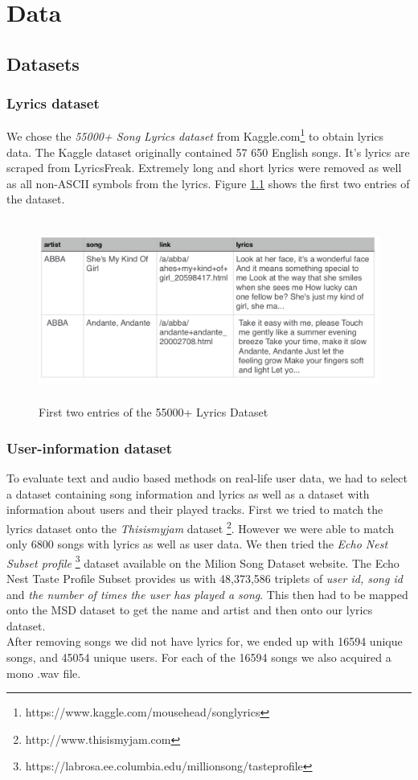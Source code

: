 \chapter{Data}

\section{Datasets}

\subsection{Lyrics dataset}
 We chose the \textit{55000+ Song Lyrics dataset} from Kaggle.com\footnote{https://www.kaggle.com/mousehead/songlyrics} to obtain lyrics data. The Kaggle dataset originally contained 57 650 English songs. It’s lyrics are scraped from LyricsFreak. Extremely long and short lyrics were removed as well as all non-ASCII symbols from the lyrics. Figure \ref{fig:lyrics_dataset} shows the first two entries of the dataset.\\
 \begin{figure}[h]
    \centering
	\includegraphics[height=60mm]{./img/dataset_preview.png}
	\caption{First two entries of the 55000+ Lyrics Dataset}
	\label{fig:lyrics_dataset}
\end{figure}

\subsection{User-information dataset}
To evaluate text and audio based methods on real-life user data, we had to select a dataset containing song information and lyrics as well as a dataset with information about users and their played tracks. First we tried to match the lyrics dataset onto the \textit{Thisismyjam} dataset \footnote{http://www.thisismyjam.com}. However we were able to match only 6800 songs with lyrics as well as user data. We then tried the \textit{Echo Nest Subset profile} \cite{Bertin-Mahieux2011} \footnote{https://labrosa.ee.columbia.edu/millionsong/tasteprofile} dataset available on the Milion Song Dataset website. 
The Echo Nest Taste Profile Subset provides us with 48,373,586 triplets of \textit{user id, song id} and \textit{the number of times the user has played a song}. This then had to be mapped onto the MSD dataset to get the name and artist and then onto our lyrics dataset.\\
After removing songs we did not have lyrics for, we ended up with 16594 unique songs, and 45054 unique users. For each of the 16594 songs we also acquired a mono .wav file. \\

